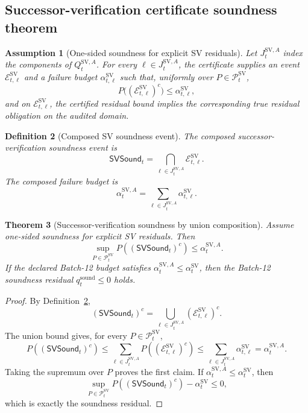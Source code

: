 \documentclass[11pt]{article}
\newtheorem{theorem}{Theorem}[section]
\newtheorem{definition}[theorem]{Definition}
\newtheorem{assumption}[theorem]{Assumption}
\newcommand{\Pcal}{\mathcal{P}}
\newcommand{\Ecal}{\mathcal{E}}
\newcommand{\1}{\mathbf{1}}
\begin{document}
\subsection{Successor-verification certificate soundness theorem}

\begin{assumption}[One-sided soundness for explicit SV residuals]
\label{ass:batch12a_one_sided_sv_residual_soundness}
Let \(J_t^{\mathrm{SV},A}\) index the components of \(Q_t^{\mathrm{SV},A}\).  For every \(\ell\in J_t^{\mathrm{SV},A}\), the certificate supplies an event \(\Ecal_{t,\ell}^{\mathrm{SV}}\) and a failure budget \(\alpha_{t,\ell}^{\mathrm{SV}}\) such that, uniformly over \(P\in\Pcal_t^{\mathrm{SV}}\),
\[
P\bigl((\Ecal_{t,\ell}^{\mathrm{SV}})^c\bigr)\le \alpha_{t,\ell}^{\mathrm{SV}},
\]
and on \(\Ecal_{t,\ell}^{\mathrm{SV}}\), the certified residual bound implies the corresponding true residual obligation on the audited domain.
\end{assumption}

\begin{definition}[Composed SV soundness event]
\label{def:batch12a_composed_sv_soundness_event}
The composed successor-verification soundness event is
\[
\mathsf{SVSound}_t
=
\bigcap_{\ell\in J_t^{\mathrm{SV},A}}\Ecal_{t,\ell}^{\mathrm{SV}}.
\]
The composed failure budget is
\[
\alpha_t^{\mathrm{SV},A}
=
\sum_{\ell\in J_t^{\mathrm{SV},A}}\alpha_{t,\ell}^{\mathrm{SV}}.
\]
\end{definition}

\begin{theorem}[Successor-verification soundness by union composition]
\label{thm:batch12a_sv_soundness_union_composition}
Assume one-sided soundness for explicit SV residuals.  Then
\[
\sup_{P\in\Pcal_t^{\mathrm{SV}}}
P((\mathsf{SVSound}_t)^c)
\le
\alpha_t^{\mathrm{SV},A}.
\]
If the declared Batch-12 budget satisfies \(\alpha_t^{\mathrm{SV},A}\le\alpha_t^{\mathrm{SV}}\), then the Batch-12 soundness residual \(q_t^{\mathrm{sound}}\le0\) holds.
\end{theorem}

\begin{proof}
By Definition~\ref{def:batch12a_composed_sv_soundness_event},
\[
(\mathsf{SVSound}_t)^c
=\bigcup_{\ell\in J_t^{\mathrm{SV},A}}(\Ecal_{t,\ell}^{\mathrm{SV}})^c.
\]
The union bound gives, for every \(P\in\Pcal_t^{\mathrm{SV}}\),
\[
P((\mathsf{SVSound}_t)^c)
\le
\sum_{\ell\in J_t^{\mathrm{SV},A}}P((\Ecal_{t,\ell}^{\mathrm{SV}})^c)
\le
\sum_{\ell\in J_t^{\mathrm{SV},A}}\alpha_{t,\ell}^{\mathrm{SV}}
=
\alpha_t^{\mathrm{SV},A}.
\]
Taking the supremum over \(P\) proves the first claim.  If \(\alpha_t^{\mathrm{SV},A}\le\alpha_t^{\mathrm{SV}}\), then
\[
\sup_{P\in\Pcal_t^{\mathrm{SV}}}P((\mathsf{SVSound}_t)^c)-\alpha_t^{\mathrm{SV}}\le0,
\]
which is exactly the soundness residual.
\end{proof}
\end{document}
